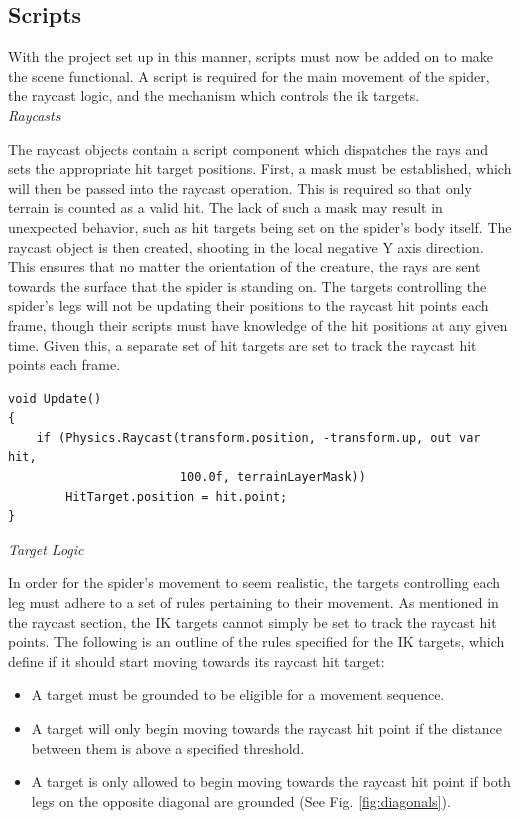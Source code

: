 \subsection{Scripts}
With the project set up in this manner, scripts must now be added on to make the
scene functional. A script is required for the main movement of the spider, the
raycast logic, and the mechanism which controls the ik targets.\\

\noindent\textit{Raycasts}

The raycast objects contain a script component which dispatches the rays and
sets the appropriate hit target positions. First, a mask must be established, which
will then be passed into the raycast operation. This is required so that only
terrain is counted as a valid hit. The lack of such a mask may result in
unexpected behavior, such as hit targets being set on the spider's body itself. The
raycast object is then created, shooting in the local negative Y axis
direction. This ensures that no matter the orientation of the creature, the rays
are sent towards the surface that the spider is standing on. The targets
controlling the spider's legs will not be updating their positions to the
raycast hit points each frame, though their scripts must have knowledge of the
hit positions at any given time. Given this, a separate set of hit targets are set
to track the raycast hit points each frame.\\

\begin{lstlisting}[basicstyle=\footnotesize, numbers=none,frame=single,
caption={Ray casts scanning for terrain. \textit{RayLogic.cs}},captionpos=b,
label=rays, language={[Sharp]c}, float=tp]
void Update()
{
    if (Physics.Raycast(transform.position, -transform.up, out var hit, 
                        100.0f, terrainLayerMask))
        HitTarget.position = hit.point;
}
\end{lstlisting}

\noindent\textit{Target Logic}

In order for the spider's movement to seem realistic, the targets controlling
each leg must adhere to a set of rules pertaining to their movement. As
mentioned in the raycast section, the IK targets cannot simply be set to track
the raycast hit points. The following is an outline of the rules specified for
the IK targets, which define if it should start moving towards its raycast hit
target:
\begin{itemize}
    \item A target must be grounded to be eligible for a movement sequence.

    \item A target will only begin moving towards the raycast hit point if the
        distance between them is above a specified threshold.

    \item A target is only allowed to begin moving towards the raycast hit
        point if both legs on the opposite diagonal are grounded (See Fig.
        \ref{fig:diagonals}).
\end{itemize}


